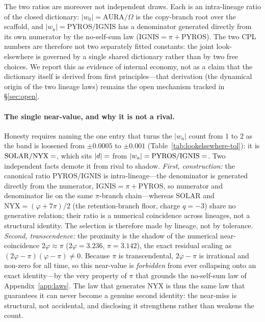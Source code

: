 \documentclass[a4paper,11pt]{article}
\begin{document}
The two ratios are moreover not independent draws. Each is an intra-lineage
ratio of the closed dictionary: $|w_0|=\mathrm{AURA}/\Omega$ is the copy-branch
root over the scaffold, and $|w_a|=\mathrm{PYROS}/\mathrm{IGNIS}$ has a
denominator generated directly from its own numerator by the no-self-sum law
($\mathrm{IGNIS}=\pi+\mathrm{PYROS}$). The two CPL numbers are
therefore not two separately fitted constants: the joint look-elsewhere is
governed by a single shared dictionary rather than by two free choices. We report this as
evidence of internal economy, not as a claim that the dictionary itself is
derived from first principles---that derivation (the dynamical origin of the
two lineage laws) remains the open mechanism tracked in \S\ref{sec:open}.

\paragraph{The single near-value, and why it is not a rival.} Honesty requires
naming the one entry that turns the $|w_a|$ count from $1$ to $2$ as the band is
loosened from $\pm0.0005$ to $\pm0.001$ (Table~\ref{tab:lookelsewhere-tol}): it is
$\mathrm{SOLAR}/\mathrm{NYX}=\val{SOLAR_NYX_d5}$, which sits $|d|=\val{solarnyx_d}$ from
$|w_a|=\mathrm{PYROS}/\mathrm{IGNIS}=\val{WA_abs_d6}$. Two independent facts demote it from
rival to shadow. \emph{First, construction:} the canonical ratio
$\mathrm{PYROS}/\mathrm{IGNIS}$ is intra-lineage---the denominator is generated
directly from the numerator, $\mathrm{IGNIS}=\pi+\mathrm{PYROS}$, so numerator and
denominator lie on the same $\pi$-branch chain---whereas $\mathrm{SOLAR}$ and
$\mathrm{NYX}=(\varphi+7\pi)/2$ (the retention-branch floor, charge $q=-3$) share
no generative relation; their ratio is a numerical coincidence across lineages, not a
structural identity. The selection is therefore made by lineage, not by tolerance. \emph{Second, transcendence:} the
proximity is the shadow of the numerical near-coincidence $2\varphi\approx\pi$
($2\varphi=3.236$, $\pi=3.142$), the exact residual scaling as
$(2\varphi-\pi)(\varphi-\pi)\neq0$. Because $\pi$ is transcendental, $2\varphi-\pi$
is irrational and non-zero for all time, so this near-value is \emph{forbidden}
from ever collapsing onto an exact identity---by the very property of $\pi$ that
grounds the no-self-sum law of Appendix~\ref{app:laws}. The law that generates
$\mathrm{NYX}$ is thus the same law that guarantees it can never become a genuine
second identity: the near-miss is structural, not accidental, and disclosing it
strengthens rather than weakens the count.
\end{document}
